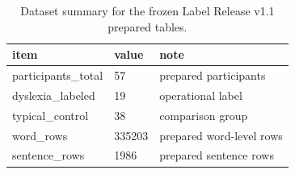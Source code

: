 \begin{table}[t]
\centering
\small
\caption{Dataset summary for the frozen Label Release v1.1 prepared tables.}
\label{tab:dataset-summary}
\begin{tabular}{lll}
\toprule
item & value & note \\
\midrule
participants\_total & 57 & prepared participants \\
dyslexia\_labeled & 19 & operational label \\
typical\_control & 38 & comparison group \\
word\_rows & 335203 & prepared word-level rows \\
sentence\_rows & 1986 & prepared sentence rows \\
\bottomrule
\end{tabular}
\end{table}
